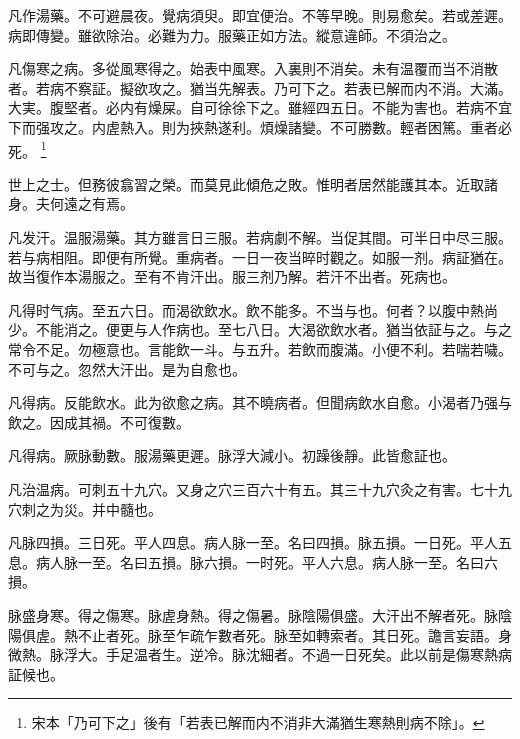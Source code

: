 凡作湯藥。不可避晨夜。覺病須臾。即宜便治。不等早晚。則易愈矣。若或差遲。病即傳變。雖欲除治。必難为力。服藥正如方法。縱意違師。不須治之。

凡傷寒之病。多從風寒得之。始表中風寒。入裏則不消矣。未有温覆而当不消散者。若病不察証。擬欲攻之。猶当先解表。乃可下之。若表已解而内不消。大滿。大実。腹堅者。必内有燥屎。自可徐徐下之。雖經四五日。不能为害也。若病不宜下而强攻之。内虗熱入。{\khaaitp 則为}挾熱遂利。煩燥諸變。不可勝數。輕者困篤。重者必死。
	\footnote{宋本「乃可下之」後有「若表已解而内不消非大滿猶生寒熱則病不除」。}

世上之士。但務彼翕習之榮。而莫見此傾危之敗。惟明者居然能護其本。近取諸身。夫何遠之有焉。

凡发汗。温服湯藥。其方雖言日三服。若病劇不解。当促其間。可半日中尽三服。若与病相阻。即便有所覺。重病者。一日一夜当晬时觀之。如服一剂。病証猶在。故当復作本湯服之。至有不肯汗出。服三剂乃解。若汗不出者。死病也。

凡得时气病。至五六日。而渴欲飲水。飲不能多。不当与也。何者？以腹中熱尚少。不能消之。便更与人作病也。至七八日。大渴欲飲水者。猶当依証与之。与之常令不足。勿極意也。言能飲一斗。与五升。若飲而腹滿。小便不利。若喘若噦。不可与之。忽然大汗出。是为自愈也。

凡得病。反能飲水。此为欲愈之病。其不曉病者。但聞病飲水自愈。小渴者乃强与飲之。因成其禍。不可復數。

凡得病。厥脉動數。服湯藥更遲。脉浮大減小。初躁後靜。此皆愈証也。

凡治温病。可刺五十九穴。又身之穴三百六十有五。其三十九穴灸之有害。七十九穴刺之为災。并中髓也。

凡脉四損。三日死。平人四息。病人脉一至。名曰四損。脉五損。一日死。平人五息。病人脉一至。名曰五損。脉六損。一时死。平人六息。病人脉一至。名曰六損。

脉盛身寒。得之傷寒。脉虗身熱。得之傷暑。脉陰陽俱盛。大汗出不解者死。脉陰陽俱虗。熱不止者死。脉至乍疏乍數者死。脉至如轉索者。其日死。譫言妄語。身微熱。脉浮大。手足温者生。逆冷。脉沈細者。不過一日死矣。此以前是傷寒熱病証候也。



%
